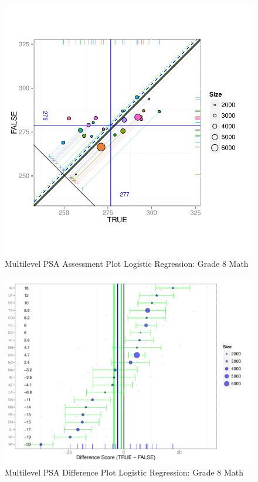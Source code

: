 \documentclass[letterpaper,12p,twoside]{article} %
\begin{document}
\begin{figure}[h!]
\begin{center}
\includegraphics[width=\textwidth]{../Figures2009/g8math-mlpsa-lr-circ.pdf}
\caption{Multilevel PSA Assessment Plot Logistic Regression: Grade 8 Math}
\end{center}
\end{figure}

\begin{figure}[h!]
\begin{center}
\includegraphics[width=\textwidth]{../Figures2009/g8math-mlpsa-lr-diff.pdf}
\caption{Multilevel PSA Difference Plot Logistic Regression: Grade 8 Math}
\end{center}
\end{figure}
\end{document}
